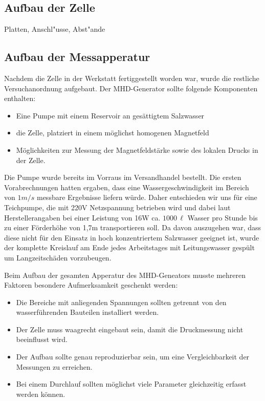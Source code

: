 \documentclass[11pt]{scrartcl}
\newcommand{\unit}[1]{\ensuremath{\,\mathrm{#1}}} %
\begin{document}
\subsection{Aufbau der Zelle}			%
Platten, Anschl"usse, Abst"ande

\subsection{Aufbau der Messapperatur}		%
Nachdem die Zelle in der Werkstatt fertiggestellt worden war, wurde die restliche Versuchanordnung aufgebaut. Der MHD-Generator sollte folgende Komponenten enthalten:

\begin{itemize}
	\item Eine Pumpe mit einem Reservoir an ges\"attigtem Salzwasser 
	\item die Zelle, platziert in einem m\"oglichst homogenen Magnetfeld 	
	\item M\"oglichkeiten zur Messung der Magnetfeldst\"arke sowie des lokalen Drucks in der Zelle.
\end{itemize}

Die Pumpe wurde bereits im Vorraus im Versandhandel bestellt. Die ersten Vorabrechnungen hatten ergaben, dass eine Wassergeschwindigkeit im Bereich von $1m/s$ messbare Ergebnisse liefern w\"urde. Daher entschieden wir uns f\"ur eine Teichpumpe, die mit 220V Netzspannung betrieben wird und dabei laut Herstellerangaben bei einer Leistung von 16W ca. $1000\unit{\ell}$ Wasser pro Stunde bis zu einer F\"orderh\"ohe von 1,7m transportieren soll. Da davon auszugehen war, dass diese nicht f\"ur den Einsatz in hoch konzentriertem Salzwasser geeignet ist, wurde der komplette Kreislauf am Ende jedes Arbeitstages mit Leitungswasser gesp\"ult um Langzeitsch\"aden vorzubeugen.

Beim Aufbau der gesamten Apperatur des MHD-Geneators musste mehreren Faktoren besondere Aufmerksamkeit geschenkt werden: 
\begin{itemize}
	\item Die Bereiche mit anliegenden Spannungen sollten getrennt von den wasserf\"uhrenden Bauteilen installiert werden. 
	\item Der Zelle muss waagrecht eingebaut sein, damit die Druckmessung nicht beeinflusst wird.
	\item Der Aufbau sollte genau reproduzierbar sein, um eine Vergleichbarkeit der Messungen zu erreichen.
	\item Bei einem Durchlauf sollten m\"oglichst viele Parameter gleichzeitig erfasst werden k\"onnen.
\end{itemize} 
\end{document}
